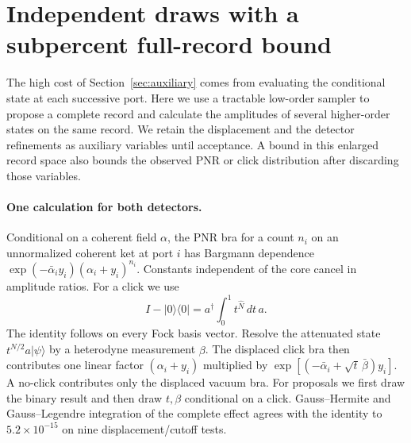 \documentclass[11pt]{article}
\begin{document}
\section{Independent draws with a subpercent full-record bound}\label{sec:bands}
The high cost of Section~\ref{sec:auxiliary} comes from evaluating the conditional state at each successive port. Here we use a tractable low-order sampler to propose a complete record and calculate the amplitudes of several higher-order states on the same record. We retain the displacement and the detector refinements as auxiliary variables until acceptance. A bound in this enlarged record space also bounds the observed PNR or click distribution after discarding those variables.

\paragraph{One calculation for both detectors.}
Conditional on a coherent field $\alpha$, the PNR bra for a count $n_i$ on an unnormalized coherent ket at port $i$ has Bargmann dependence $\exp(-\bar\alpha_i y_i)(\alpha_i+y_i)^{n_i}$. Constants independent of the core cancel in amplitude ratios. For a click we use
\[
 I-|0\rangle\langle0|=a^\dagger\!\int_0^1 t^{\hat N}\,dt\,a.
\]
The identity follows on every Fock basis vector. Resolve the attenuated state $t^{\hat N/2}a|\psi\rangle$ by a heterodyne measurement $\beta$. The displaced click bra then contributes one linear factor $(\alpha_i+y_i)$ multiplied by $\exp[(-\bar\alpha_i+\sqrt t\,\bar\beta)y_i]$. A no-click contributes only the displaced vacuum bra. For proposals we first draw the binary result and then draw $t,\beta$ conditional on a click. Gauss--Hermite and Gauss--Legendre integration of the complete effect agrees with the identity to $5.2\times10^{-15}$ on nine displacement/cutoff tests.
\end{document}
